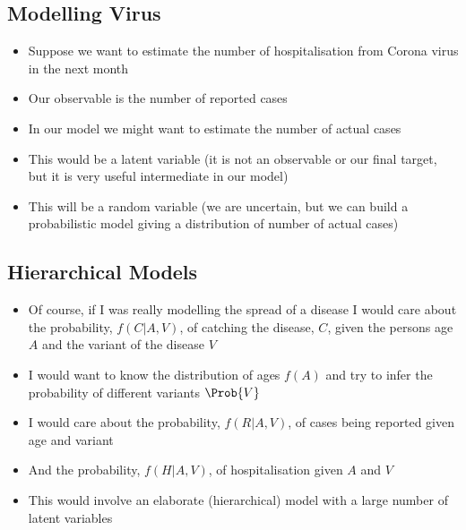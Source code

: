 
\begin{slide}
\section{Modelling Virus}

\begin{PauseHighLight}
  \begin{itemize}
  \item Suppose we want to estimate the number of hospitalisation from Corona
    virus in the next month\pause
  \item Our observable is the number of reported cases\pause
  \item In our model we might want to estimate the number of actual
    cases\pause
  \item This would be a latent variable (it is not an observable or
    our final target, but it is very useful intermediate in our
    model)\pause
  \item This will be a random variable (we are uncertain, but we can
    build a probabilistic model giving a distribution of number of
    actual cases)\pause
  \end{itemize}
\end{PauseHighLight}

\end{slide}


\begin{slide}
\section{Hierarchical Models}
  
\begin{PauseHighLight}
  \begin{itemize}
  \item Of course, if I was really modelling the spread of a disease I
    would care about the probability, $f(C|A, V)$, of catching the disease, $C$,
    given the persons age $A$ and the variant of the disease
    $V$\pause
  \item I would want to know the distribution of ages $f(A)$ and try
    to infer the probability of different variants $\Prob{V}$\pause
  \item I would care about the probability, $f(R|A,V)$, of cases being
    reported given age and variant\pause
  \item And the probability, $f(H|A,V)$, of hospitalisation  given $A$
    and $V$\pause
  \item This would involve an elaborate (hierarchical) model with a
    large number of latent variables\pause
  \end{itemize}
\end{PauseHighLight}

\end{slide}


